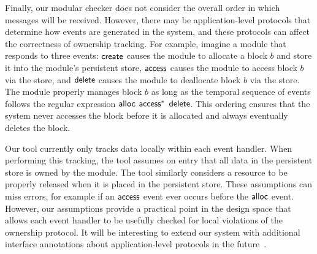 %
Finally, our modular checker does not consider the overall order in
which messages will be received.  However, there may be
application-level protocols that determine how events are generated in
the system, and these protocols can affect the correctness of
ownership tracking.
%
For example, imagine a module that responds to three events: ${\mathsf{create}}$
causes the module to allocate a block $b$ and store it into the
module's persistent store, ${\mathsf{access}}$ causes the module to access block
$b$ via the  store, and ${\mathsf{delete}}$ causes the module to deallocate
block $b$ via the store.  The module properly manages block $b$ as
long as the temporal sequence of events follows the regular expression
${\mathsf{alloc}}$ ${\mathsf{access}}^*$ ${\mathsf{delete}}$.  This ordering ensures that the system
never accesses the block before it is allocated and always eventually
deletes the block.

Our tool currently only tracks data locally within each event handler.
When performing this tracking, the tool assumes on entry that all data
in the persistent store is owned by the module.  The tool similarly
considers a resource to be properly released when it is placed in the
persistent store.  These assumptions can miss errors, for example if
an ${\mathsf{access}}$ event ever occurs before the ${\mathsf{alloc}}$ event.  However,
our assumptions provide a practical point in the design space that
allows each event handler to be usefully checked for local violations
of the ownership protocol.
%
It will be interesting to extend our system with additional interface
annotations about application-level protocols in the
future~\cite{AlurPOPL05,HJM05}.


